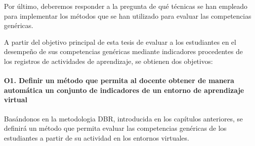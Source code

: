Por último, deberemos responder a la pregunta de qué técnicas se han empleado para implementar los métodos que se han utilizado para evaluar las competencias genéricas.











A partir del objetivo principal de esta tesis de evaluar a los estudiantes en el desempeño de sus competencias genéricas mediante indicadores procedentes de los registros de actividades de aprendizaje, se obtienen dos objetivos:
 
\paragraph*{O1. Definir un método que permita al docente obtener de manera automática un conjunto de indicadores de un entorno de aprendizaje virtual}

Basándonos en la metodologia DBR, introducida en los capítulos anteriores, se definirá un método que permita evaluar las competencias genéricas de los estudiantes a partir de su actividad en los entornos virtuales.

